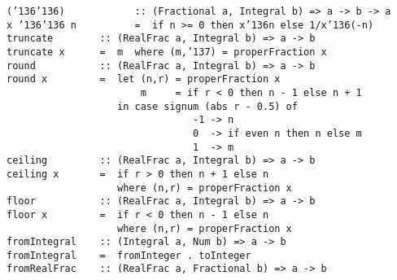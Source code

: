 %
\eprogB\noindent\bprogB
\mbox{\tt ({\char'136}{\char'136})\ \ \ \ \ \ \ \ \ \ \ \ ::\ (Fractional\ a,\ Integral\ b)\ =>\ a\ ->\ b\ ->\ a}\\
\mbox{\tt x\ {\char'136}{\char'136}\ n\ \ \ \ \ \ \ \ \ \ =\ \ if\ n\ >=\ 0\ then\ x{\char'136}n\ else\ 1/x{\char'136}(-n)}
%
\eprogB\noindent\bprogB
\mbox{\tt truncate\ \ \ \ \ \ \ \ ::\ (RealFrac\ a,\ Integral\ b)\ =>\ a\ ->\ b}\\
\mbox{\tt truncate\ x\ \ \ \ \ \ =\ \ m\ \ where\ (m,{\char'137})\ =\ properFraction\ x}
%
\eprogB\noindent\bprogB
\mbox{\tt round\ \ \ \ \ \ \ \ \ \ \ ::\ (RealFrac\ a,\ Integral\ b)\ =>\ a\ ->\ b}\\
\mbox{\tt round\ x\ \ \ \ \ \ \ \ \ =\ \ let\ (n,r)\ =\ properFraction\ x}\\
\mbox{\tt \ \ \ \ \ \ \ \ \ \ \ \ \ \ \ \ \ \ \ \ \ \ \ m\ \ \ \ \ =\ if\ r\ <\ 0\ then\ n\ -\ 1\ else\ n\ +\ 1}\\
\mbox{\tt \ \ \ \ \ \ \ \ \ \ \ \ \ \ \ \ \ \ \ in\ case\ signum\ (abs\ r\ -\ 0.5)\ of}\\
\mbox{\tt \ \ \ \ \ \ \ \ \ \ \ \ \ \ \ \ \ \ \ \ \ \ \ \ \ \ \ \ \ \ \ \ -1\ ->\ n}\\
\mbox{\tt \ \ \ \ \ \ \ \ \ \ \ \ \ \ \ \ \ \ \ \ \ \ \ \ \ \ \ \ \ \ \ \ 0\ \ ->\ if\ even\ n\ then\ n\ else\ m}\\
\mbox{\tt \ \ \ \ \ \ \ \ \ \ \ \ \ \ \ \ \ \ \ \ \ \ \ \ \ \ \ \ \ \ \ \ 1\ \ ->\ m}
%
\eprogB\noindent\bprogB
\mbox{\tt ceiling\ \ \ \ \ \ \ \ \ ::\ (RealFrac\ a,\ Integral\ b)\ =>\ a\ ->\ b}\\
\mbox{\tt ceiling\ x\ \ \ \ \ \ \ =\ \ if\ r\ >\ 0\ then\ n\ +\ 1\ else\ n}\\
\mbox{\tt \ \ \ \ \ \ \ \ \ \ \ \ \ \ \ \ \ \ \ where\ (n,r)\ =\ properFraction\ x}
%
\eprogB\noindent\bprogB
\mbox{\tt floor\ \ \ \ \ \ \ \ \ \ \ ::\ (RealFrac\ a,\ Integral\ b)\ =>\ a\ ->\ b}\\
\mbox{\tt floor\ x\ \ \ \ \ \ \ \ \ =\ \ if\ r\ <\ 0\ then\ n\ -\ 1\ else\ n}\\
\mbox{\tt \ \ \ \ \ \ \ \ \ \ \ \ \ \ \ \ \ \ \ where\ (n,r)\ =\ properFraction\ x}
%
\eprogB\noindent\bprogB
\mbox{\tt fromIntegral\ \ \ \ ::\ (Integral\ a,\ Num\ b)\ =>\ a\ ->\ b}\\
\mbox{\tt fromIntegral\ \ \ \ =\ \ fromInteger\ .\ toInteger}
%
\eprogB\noindent\bprogB
\mbox{\tt fromRealFrac\ \ \ \ ::\ (RealFrac\ a,\ Fractional\ b)\ =>\ a\ ->\ b}\\
